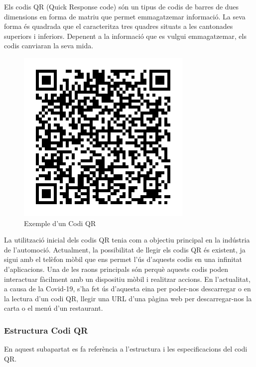 Els codis QR (Quick Response code) són un tipus de
codis de barres de dues dimensions en forma de matriu que permet emmagatzemar informació.
La seva forma és quadrada que el caracteritza tres quadres situats a les cantonades superiors
i inferiors. Depenent a la informació que es vulgui emmagatzemar, els codis canviaran la seva
mida.

\begin{figure}[H]
    \begin{center}
      \includegraphics[scale=0.50]{Fotos/BenvingutsCodiQR.png}
    \end{center}
    \caption{Exemple d'un Codi QR}
    \label{fig:compiler_phases}
  \end{figure}

La utilització inicial dels codis QR tenia com a objectiu principal en la indústria de l'automoció.
Actualment, la possibilitat de llegir els codis QR és existent, ja sigui amb el telèfon mòbil que ens permet l'ús d'aquests
codis en una infinitat d'aplicacions. Una de les raons principals són perquè aquests codis poden interactuar fàcilment amb
un dispositiu mòbil i realitzar accions. En l'actualitat, a causa de la Covid-19, s'ha fet ús d'aquesta eina per poder-nos
descarregar o en la lectura d'un codi QR, llegir una URL d'una pàgina web per descarregar-nos la carta o el menú d'un restaurant.

\subsubsection{Estructura Codi QR}

En aquest subapartat es fa referència a l'estructura i les especificacions del codi QR.

